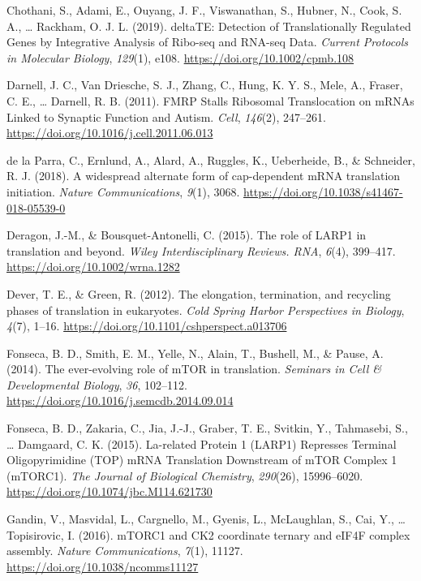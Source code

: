 \documentclass[12pt,openany]{book}
\begin{document}
\hypertarget{ref-Chothani2019}{}
Chothani, S., Adami, E., Ouyang, J. F., Viswanathan, S., Hubner, N.,
Cook, S. A., \ldots{} Rackham, O. J. L. (2019). deltaTE: Detection of
Translationally Regulated Genes by Integrative Analysis of Ribo-seq and
RNA-seq Data. \emph{Current Protocols in Molecular Biology},
\emph{129}(1), e108. \url{https://doi.org/10.1002/cpmb.108}

\hypertarget{ref-Darnell2011}{}
Darnell, J. C., Van Driesche, S. J., Zhang, C., Hung, K. Y. S., Mele,
A., Fraser, C. E., \ldots{} Darnell, R. B. (2011). FMRP Stalls Ribosomal
Translocation on mRNAs Linked to Synaptic Function and Autism.
\emph{Cell}, \emph{146}(2), 247--261.
\url{https://doi.org/10.1016/j.cell.2011.06.013}

\hypertarget{ref-delaParra2018}{}
de la Parra, C., Ernlund, A., Alard, A., Ruggles, K., Ueberheide, B., \&
Schneider, R. J. (2018). A widespread alternate form of cap-dependent
mRNA translation initiation. \emph{Nature Communications}, \emph{9}(1),
3068. \url{https://doi.org/10.1038/s41467-018-05539-0}

\hypertarget{ref-Deragon2015}{}
Deragon, J.-M., \& Bousquet-Antonelli, C. (2015). The role of LARP1 in
translation and beyond. \emph{Wiley Interdisciplinary Reviews. RNA},
\emph{6}(4), 399--417. \url{https://doi.org/10.1002/wrna.1282}

\hypertarget{ref-Dever2012}{}
Dever, T. E., \& Green, R. (2012). The elongation, termination, and
recycling phases of translation in eukaryotes. \emph{Cold Spring Harbor
Perspectives in Biology}, \emph{4}(7), 1--16.
\url{https://doi.org/10.1101/cshperspect.a013706}

\hypertarget{ref-Fonseca2014}{}
Fonseca, B. D., Smith, E. M., Yelle, N., Alain, T., Bushell, M., \&
Pause, A. (2014). The ever-evolving role of mTOR in translation.
\emph{Seminars in Cell \& Developmental Biology}, \emph{36}, 102--112.
\url{https://doi.org/10.1016/j.semcdb.2014.09.014}

\hypertarget{ref-Fonseca2015}{}
Fonseca, B. D., Zakaria, C., Jia, J.-J., Graber, T. E., Svitkin, Y.,
Tahmasebi, S., \ldots{} Damgaard, C. K. (2015). La-related Protein 1
(LARP1) Represses Terminal Oligopyrimidine (TOP) mRNA Translation
Downstream of mTOR Complex 1 (mTORC1). \emph{The Journal of Biological
Chemistry}, \emph{290}(26), 15996--6020.
\url{https://doi.org/10.1074/jbc.M114.621730}

\hypertarget{ref-Gandin2016}{}
Gandin, V., Masvidal, L., Cargnello, M., Gyenis, L., McLaughlan, S.,
Cai, Y., \ldots{} Topisirovic, I. (2016). mTORC1 and CK2 coordinate
ternary and eIF4F complex assembly. \emph{Nature Communications},
\emph{7}(1), 11127. \url{https://doi.org/10.1038/ncomms11127}
\end{document}
